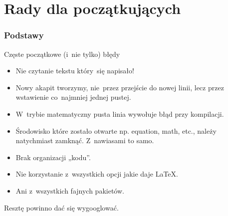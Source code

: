 \documentclass[10pt,t]{beamer}
\begin{document}
\section{Rady dla początkujących}



\begin{frame}
  \frametitle{Podstawy}


  Częste początkowe (i~nie tylko) błędy

  \begin{itemize}
    \RaggedRight

  \item {\Large \color{red} Nie czytanie tekstu który~się
      napisało!}

  \item Nowy akapit tworzymy, nie~przez przejście do nowej
    linii, lecz przez wstawienie co~najmniej jednej pustej.

  \item W~trybie matematyczny pusta linia wywołuje błąd przy
    kompilacji.

  \item Środowisko które zostało otwarte np. equation, math,
    etc., należy {\color{red} natychmiast zamknąć}. Z~nawiasami to
    samo.

  \item Brak organizacji „kodu”.

  \item Nie korzystanie z~wszystkich opcji jakie daje \LaTeX.

  \item Ani z~wszystkich fajnych pakietów.

  \end{itemize}



  Resztę powinno dać się {\color{blue} wygooglować}.

\end{frame}
\end{document}
